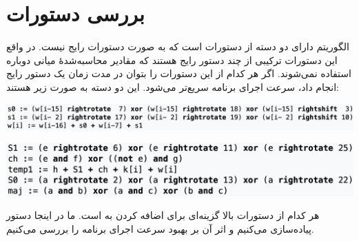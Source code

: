 \documentclass[12pt,titlepage,a4page , tikz , multi,table , svgnames,xcdraw]{article}
\begin{document}
\newpage
\pagestyle{fancy}
\fancyhf{}
\fancyfoot{}

\cfoot{\thepage}

\newpage
\section{بررسی دستورات}
الگوریتم
دارای دو دسته از دستورات است که به صورت دستورات رایج
نیست. در واقع این دستورات ترکیبی از چند دستور رایج
هستند که مقادیر محاسبه‌شدهٔ میانی دوباره استفاده نمی‌شوند. اگر هر کدام از این دستورات را بتوان در مدت زمان یک دستور رایج
انجام داد، سرعت اجرای برنامه سریع‌تر می‌شود. این دو دسته به صورت زیر هستند:
\par
\includegraphics[width=\textwidth]{1.png}
\par
\includegraphics[width=\textwidth]{2.png}
\par
هر کدام از دستورات بالا گزینه‌ای برای اضافه کردن به
است. ما در اینجا دستور\\
پیاده‌سازی می‌کنیم و اثر آن بر بهبود سرعت اجرای برنامه را بررسی می‌کنیم.
\newpage
\end{document}
